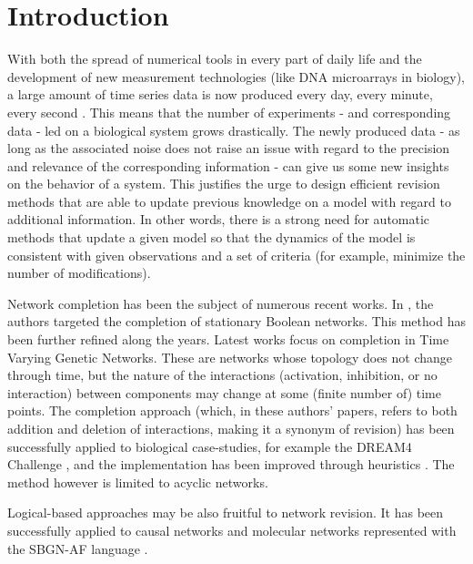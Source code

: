 \section{Introduction} 

With both the spread of numerical tools in every part of daily life and the development of new measurement technologies (like DNA microarrays in biology), a large amount of time series data is now produced every day, every minute, every second \cite{marx2013biology}. This means that the number of experiments - and corresponding data - led on a biological system grows drastically. The newly produced data - as long as the associated noise does not raise an issue with regard to the precision and relevance of the corresponding information - can give us some new insights on the behavior of a system. This justifies the urge to design efficient revision methods that are able to update previous knowledge on a model with regard to additional information. In other words, there is a strong need for automatic methods that update a given model so that the dynamics of the model is consistent with given observations and a set of criteria (for example, minimize the number of modifications). 

Network completion has been the subject of numerous recent works. In \cite{akutsu2009completing}, the authors targeted the completion of stationary Boolean networks. This method has been further refined along the years. Latest works \cite{nakajima2013network} focus on completion in Time Varying Genetic Networks. These are networks whose topology does not change through time, but the nature of the interactions (activation, inhibition, or no interaction) between components may change at some (finite number of) time points. The completion approach (which, in these authors' papers, refers to both addition and deletion of interactions, making it a synonym of revision) has been successfully applied to biological case-studies, for example the DREAM4 Challenge \cite{nakajima2014network}, and the implementation has been improved through heuristics \cite{nakajima2014exact}. The method however is limited to acyclic networks. 

Logical-based approaches may be also fruitful to network revision. It has been successfully applied to causal networks \cite{inoue2013completing} and molecular networks represented with the SBGN-AF language \cite{yamamoto2014completing}. 

